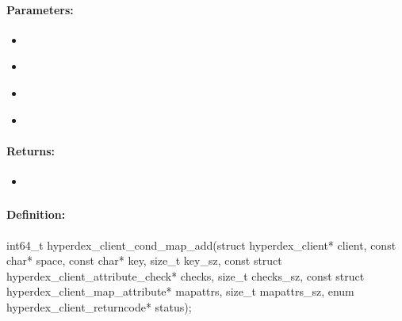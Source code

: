 \paragraph{Parameters:}
\begin{itemize}[noitemsep]
\item {}\\

\item {}\\

\item {}\\

\item {}\\

\end{itemize}

\paragraph{Returns:}
\begin{itemize}[noitemsep]
\item {}\\

\end{itemize}

\pagebreak
\subsubsection{}
\label{api:c:cond_map_add}


\paragraph{Definition:}
\begin{ccode}
int64_t hyperdex_client_cond_map_add(struct hyperdex_client* client,
        const char* space,
        const char* key, size_t key_sz,
        const struct hyperdex_client_attribute_check* checks, size_t checks_sz,
        const struct hyperdex_client_map_attribute* mapattrs, size_t mapattrs_sz,
        enum hyperdex_client_returncode* status);
\end{ccode}

